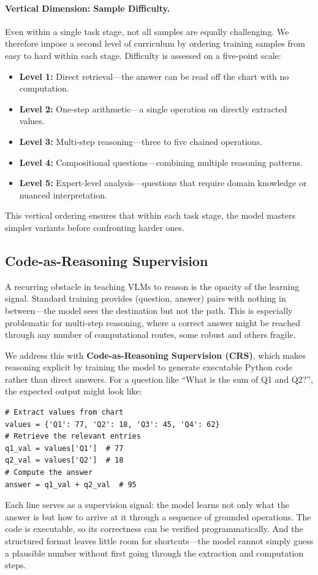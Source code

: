 \documentclass[journal]{IEEEtran}
\newcommand{\crs}{CRS}
\begin{document}
\paragraph{Vertical Dimension: Sample Difficulty.}
Even within a single task stage, not all samples are equally challenging. We therefore impose a second level of curriculum by ordering training samples from easy to hard within each stage. Difficulty is assessed on a five-point scale:
\begin{itemize}
    \item \textbf{Level 1:} Direct retrieval---the answer can be read off the chart with no computation.
    \item \textbf{Level 2:} One-step arithmetic---a single operation on directly extracted values.
    \item \textbf{Level 3:} Multi-step reasoning---three to five chained operations.
    \item \textbf{Level 4:} Compositional questions---combining multiple reasoning patterns.
    \item \textbf{Level 5:} Expert-level analysis---questions that require domain knowledge or nuanced interpretation.
\end{itemize}
This vertical ordering ensures that within each task stage, the model masters simpler variants before confronting harder ones.

\subsection{Code-as-Reasoning Supervision}
\label{sec:crs}
A recurring obstacle in teaching VLMs to reason is the opacity of the learning signal. Standard training provides (question, answer) pairs with nothing in between---the model sees the destination but not the path. This is especially problematic for multi-step reasoning, where a correct answer might be reached through any number of computational routes, some robust and others fragile.

We address this with \textbf{Code-as-Reasoning Supervision (\crs{})}, which makes reasoning explicit by training the model to generate executable Python code rather than direct answers. For a question like ``What is the sum of Q1 and Q2?'', the expected output might look like:
\begin{small}
\begin{verbatim}
# Extract values from chart
values = {'Q1': 77, 'Q2': 18, 'Q3': 45, 'Q4': 62}
# Retrieve the relevant entries
q1_val = values['Q1']  # 77
q2_val = values['Q2']  # 18
# Compute the answer
answer = q1_val + q2_val  # 95
\end{verbatim}
\end{small}
Each line serves as a supervision signal: the model learns not only what the answer is but how to arrive at it through a sequence of grounded operations. The code is executable, so its correctness can be verified programmatically. And the structured format leaves little room for shortcuts---the model cannot simply guess a plausible number without first going through the extraction and computation steps.
\end{document}

